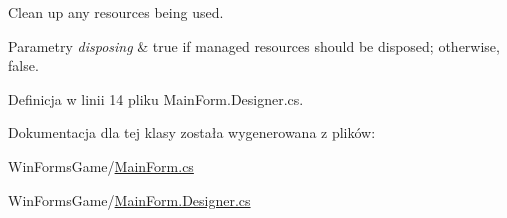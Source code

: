 Clean up any resources being used. 


\begin{DoxyParams}{Parametry}
{\em disposing} & true if managed resources should be disposed; otherwise, false.\\
\hline
\end{DoxyParams}


Definicja w linii 14 pliku Main\+Form.\+Designer.\+cs.



Dokumentacja dla tej klasy została wygenerowana z plików\+:\begin{DoxyCompactItemize}
\item 
Win\+Forms\+Game/\hyperlink{_main_form_8cs}{Main\+Form.\+cs}\item 
Win\+Forms\+Game/\hyperlink{_main_form_8_designer_8cs}{Main\+Form.\+Designer.\+cs}\end{DoxyCompactItemize}
